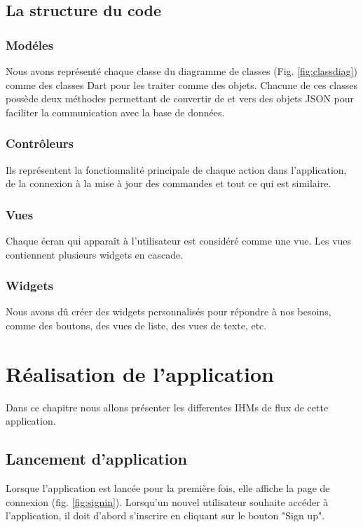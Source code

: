 \documentclass[french, a4paper, 12pt]{report}
\begin{document}
	
	\newpage		
	\section{La structure du code}
		\subsection{Modéles} Nous avons représenté chaque classe du diagramme de classes (Fig. \ref{fig:classdiag}) comme des classes Dart pour les traiter comme des objets. Chacune de ces classes possède deux méthodes permettant de convertir de et vers des objets JSON  pour faciliter la communication avec la base de données.
		\subsection{Contrôleurs} Ils représentent la fonctionnalité principale de chaque action dans l'application, de la connexion à la mise à jour des commandes et tout ce qui est similaire.
		\subsection{Vues} Chaque écran qui apparaît à l'utilisateur est considéré comme une vue. Les vues contiennent plusieurs widgets en cascade.
		\subsection{Widgets} Nous avons dû créer des widgets personnalisés pour répondre à nos besoins, comme des boutons, des vues de liste, des vues de texte, etc.
		
\newpage
\chapter{Réalisation de l'application} Dans ce chapitre nous allons présenter les differentes IHMs de flux de cette application.
	\section{Lancement d'application} Lorsque l'application est lancée pour la première fois, elle affiche la page de connexion (fig. \ref{fig:signin}).
Lorsqu'un nouvel utilisateur souhaite accéder à l'application, il doit d'abord s'inscrire en cliquant sur le bouton "Sign up".
\end{document}
